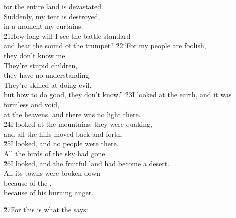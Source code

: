 \begin{poetry}
\poemll    for the entire land is devastated. \\
\poeml Suddenly, my tent is destroyed, \\
\poemll    in a moment my curtains. \\
\poeml \v{21}How long will I see the battle standard \\
\poemll    and hear the sound of the trumpet?
\poeml \v{22}``For my people are foolish, \\
\poemll    they don't know me. \\
\poeml They're stupid children, \\
\poemll    they have no understanding. \\
\poeml They're skilled at doing evil, \\
\poemll    but how to do good, they don't know.''
\poeml \v{23}I looked at the earth, and it was formless and void, \\
\poemll    at the heavens, and there was no light there. \\
\poeml \v{24}I looked at the mountains; they were quaking, \\
\poemll    and all the hills moved back and forth. \\
\poeml \v{25}I looked, and no people were there. \\
\poemll    All the birds of the sky had gone. \\
\poeml \v{26}I looked, and the fruitful land had become a desert. \\
\poemll    All its towns were broken down \\
\poeml because of the , \\
\poemll    because of his burning anger.
\end{poetry}

\begin{poetry}
\poeml \v{27}For this is what the  says:
\end{poetry}

